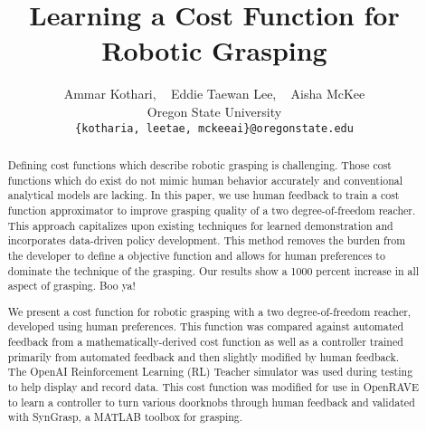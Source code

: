 \documentclass{article}
\begin{document}
\title{Learning a Cost Function for Robotic Grasping}
\author{Ammar Kothari, {~} Eddie Taewan Lee, {~} Aisha McKee\\
    Oregon State University \\
    \texttt{\{kotharia, leetae, mckeeai\}@oregonstate.edu}}

\maketitle

\begin{abstract}



    Defining cost functions which describe robotic grasping is challenging. Those cost functions which do exist do not mimic human behavior accurately and conventional analytical models are lacking. In this paper, we use human feedback to train a cost function approximator to improve grasping quality of a two degree-of-freedom reacher. This approach capitalizes upon existing techniques for learned demonstration and incorporates data-driven policy development. This method removes the burden from the developer to define a objective function and allows for human preferences to dominate the technique of the grasping. Our results show a 1000 percent increase in all aspect of grasping. Boo ya!

    We present a cost function for robotic grasping with a two degree-of-freedom reacher, developed using human preferences. This function was compared against automated feedback from a mathematically-derived cost function as well as a controller trained primarily from automated feedback and then slightly modified by human feedback. The OpenAI Reinforcement Learning (RL) Teacher simulator was used during testing to help display and record data. This cost function was modified for use in OpenRAVE to learn a controller to turn various doorknobs through human feedback and validated with SynGrasp, a MATLAB toolbox for grasping.  

\end{abstract}
\end{document}
